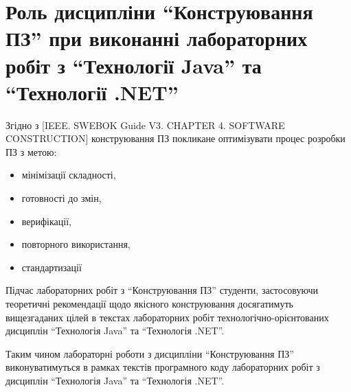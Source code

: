 \section{Роль дисципліни ``Конструювання ПЗ'' при виконанні лабораторних робіт з ``Технології Java'' та ``Технології .NET''}
Згідно з [IEEE. SWEBOK Guide V3. CHAPTER 4. SOFTWARE CONSTRUCTION] конструювання ПЗ покликане оптимізувати процес розробки ПЗ з метою:
\begin{itemize}
\item мінімізації складності,
\item готовності до змін,
\item верифікації,
\item повторного використання,
\item стандартизації
\end{itemize}

Підчас лабораторних робіт з ``Конструювання ПЗ'' студенти, застосовуючи теоретичні рекомендації щодо якісного конструювання досягатимуть вищезгаданих цілей в текстах лабораторних робіт технологічно-орієнтованих дисциплін ``Технологія Java'' та ``Технологія .NET''.

Таким чином лабораторні роботи з дисципліни ``Конструювання ПЗ'' виконуватимуться в рамках текстів програмного коду лабораторних робіт з дисциплін ``Технологія Java'' та ``Технологія .NET''.

